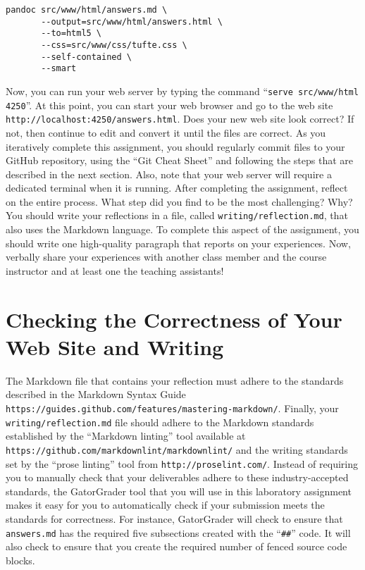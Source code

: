 \documentclass[11pt]{article}
\newcommand{\mainprogram}{\lstinline{answers.md}}
\newcommand{\reflection}{\lstinline{writing/reflection.md}}
\newcommand{\command}[1]{``\lstinline{#1}''}
\newcommand{\url}[1]{\lstinline{#1}}
\newcommand{\step}[1]{``{#1}''}
\begin{document}
\vspace*{-.2in}

\begin{verbatim}
pandoc src/www/html/answers.md \
       --output=src/www/html/answers.html \
       --to=html5 \
       --css=src/www/css/tufte.css \
       --self-contained \
       --smart
\end{verbatim}

\vspace*{-.05in}

Now, you can run your web server by typing the command \command{serve
src/www/html 4250}. At this point, you can start your web browser and go to the
web site \url{http://localhost:4250/answers.html}. Does your new web site look
correct? If not, then continue to edit and convert it until the files are
correct. As you iteratively complete this assignment, you should regularly
commit files to your GitHub repository, using the ``Git Cheat Sheet'' and
following the steps that are described in the next section. Also, note that
your web server will require a dedicated terminal when it is running. After
completing the assignment, reflect on the entire process. What step did you
find to be the most challenging? Why? You should write your reflections in a
file, called \reflection{}, that also uses the Markdown language. To complete
this aspect of the assignment, you should write one high-quality paragraph that
reports on your experiences. Now, verbally share your experiences with another
class member and the course instructor and at least one the teaching
assistants!

\section*{Checking the Correctness of Your Web Site and Writing}

The Markdown file that contains your reflection must adhere to the standards
described in the Markdown Syntax Guide
\url{https://guides.github.com/features/mastering-markdown/}. Finally, your
\reflection{} file should adhere to the Markdown standards established by the
\step{Markdown linting} tool available at
\url{https://github.com/markdownlint/markdownlint/} and the writing standards
set by the \step{prose linting} tool from \url{http://proselint.com/}. Instead
of requiring you to manually check that your deliverables adhere to these
industry-accepted standards, the GatorGrader tool that you will use in this
laboratory assignment makes it easy for you to automatically check if your
submission meets the standards for correctness. For instance, GatorGrader will
check to ensure that \mainprogram{} has the required five subsections created
with the \command{##} code. It will also check to ensure that you create the
required number of fenced source code blocks.
\end{document}
